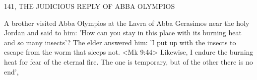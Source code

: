 141, THE JUDICIOUS REPLY OF ABBA OLYMPIOS

A brother visited Abba Olympios at the Lavra of Abba Gerasimos
near the holy Jordan and said to him: 'How can you stay in this
place with its burning heat and so many insects'? The elder
answered him: 'I put up with the insects to escape from the worm
that sleeps not.
<Mk 9:44> Likewise, I endure the burning heat for
fear of the eternal fire.
The one is temporary, but of the other there
is no end',

